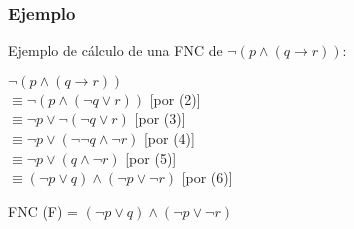 \documentclass[12pt,twoside]{article}
\begin{document}
\subsubsection{Ejemplo}
Ejemplo de cálculo de una FNC de $\neg(p \wedge (q \rightarrow r))$: \\
\begin{cent}

$\neg(p \wedge (q \rightarrow r))$ \\
$\equiv \neg(p \wedge (\neg q \vee r)) $ \hspace{65}  [por (2)]\\
$\equiv \neg p \vee \neg(\neg q \vee r)$ \hspace{66}  [por (3)]\\
$\equiv \neg p \vee (\neg \neg q \wedge \neg r)$ \hspace{58}  [por (4)]\\
$\equiv \neg p \vee (q \wedge \neg r)$
\hspace{74} [por (5)]\\
$\equiv (\neg p \vee q) \wedge (\neg p \vee \neg r)$
\hspace{38}  [por (6)]\\
\end{cent}

\begin{center}
    FNC (F) = $(\neg p \vee q) \wedge (\neg p \vee \neg r)$
\end{center}
\newpage
\end{document}

